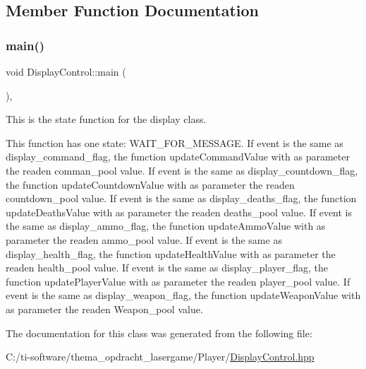 \subsection{Member Function Documentation}
\mbox{\label{class_display_control_a9707c32249e0a648afc2def818900f30}} 
\subsubsection{\texorpdfstring{main()}{main()}}
{\footnotesize\ttfamily void Display\+Control\+::main (\begin{DoxyParamCaption}{ }\end{DoxyParamCaption})\hspace{0.3cm}{\ttfamily [inline]}, {\ttfamily [override]}}



This is the state function for the display class. 

This function has one state\+: W\+A\+I\+T\+\_\+\+F\+O\+R\+\_\+\+M\+E\+S\+S\+A\+GE. If event is the same as display\+\_\+command\+\_\+flag, the function update\+Command\+Value with as parameter the readen comman\+\_\+pool value. If event is the same as display\+\_\+countdown\+\_\+flag, the function update\+Countdown\+Value with as parameter the readen countdown\+\_\+pool value. If event is the same as display\+\_\+deaths\+\_\+flag, the function update\+Deaths\+Value with as parameter the readen deaths\+\_\+pool value. If event is the same as display\+\_\+ammo\+\_\+flag, the function update\+Ammo\+Value with as parameter the readen ammo\+\_\+pool value. If event is the same as display\+\_\+health\+\_\+flag, the function update\+Health\+Value with as parameter the readen health\+\_\+pool value. If event is the same as display\+\_\+player\+\_\+flag, the function update\+Player\+Value with as parameter the readen player\+\_\+pool value. If event is the same as display\+\_\+weapon\+\_\+flag, the function update\+Weapon\+Value with as parameter the readen Weapon\+\_\+pool value. 

The documentation for this class was generated from the following file\+:\begin{DoxyCompactItemize}
\item 
C\+:/ti-\/software/thema\+\_\+opdracht\+\_\+lasergame/\+Player/\mbox{\hyperlink{_display_control_8hpp}{Display\+Control.\+hpp}}\end{DoxyCompactItemize}
